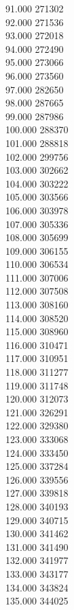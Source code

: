 { 91.000	271302 \\
 92.000	271536 \\
 93.000	272018 \\
 94.000	272490 \\
 95.000	273066 \\
 96.000	273560 \\
 97.000	282650 \\
 98.000	287665 \\
 99.000	287986 \\
 100.000	288370 \\
 101.000	288818 \\
 102.000	299756 \\
 103.000	302662 \\
 104.000	303222 \\
 105.000	303566 \\
 106.000	303978 \\
 107.000	305336 \\
 108.000	305699 \\
 109.000	306155 \\
 110.000	306534 \\
 111.000	307006 \\
 112.000	307508 \\
 113.000	308160 \\
 114.000	308520 \\
 115.000	308960 \\
 116.000	310471 \\
 117.000	310951 \\
 118.000	311277 \\
 119.000	311748 \\
 120.000	312073 \\
 121.000	326291 \\
 122.000	329380 \\
 123.000	333068 \\
 124.000	333450 \\
 125.000	337284 \\
 126.000	339556 \\
 127.000	339818 \\
 128.000	340193 \\
 129.000	340715 \\
 130.000	341462 \\
 131.000	341490 \\
 132.000	341977 \\
 133.000	343177 \\
 134.000	343824 \\
 135.000	344025 \\
}
